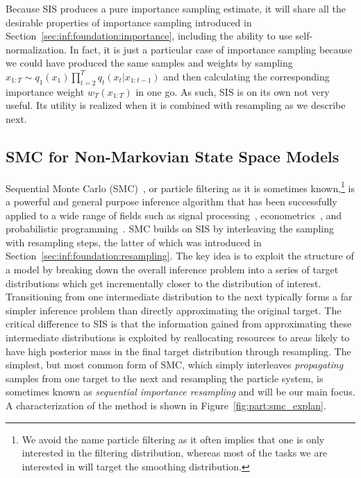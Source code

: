 Because SIS produces a pure importance sampling estimate, it will share all the desirable properties
of importance sampling introduced in Section~\ref{sec:inf:foundation:importance}, including the
ability to use self-normalization.  In fact, it is just
a particular case of importance sampling because we could have produced the same samples and weights
by sampling $x_{1:T} \sim q_1(x_1) \prod_{t=2}^{T} q_t (x_t | x_{1:t-1})$ and then calculating the
corresponding importance weight $w_T(x_{1:T})$ in one go. As such, 
SIS is on its own not very useful.  Its utility is realized when it is combined with resampling as we describe next.

\subsection{SMC for Non-Markovian State Space Models}
\label{sec:part:smc:smc-nmssm}

Sequential Monte Carlo (SMC)~\citep{gordon1993novel,doucet2001sequential,doucet2009tutorial}, or particle filtering 
as it is sometimes known,\footnote{We avoid the name
	particle filtering as it often implies that one is only interested in the filtering distribution, whereas
	most of the tasks we are interested in will target the smoothing distribution.} 
is a powerful and general purpose inference algorithm that has been successfully
applied to a wide range of fields such as signal processing~\citep{candy2016bayesian}, econometrics~\citep{creal2012survey}, 
and probabilistic programming~\citep{wood2014new}.  SMC builds on SIS by interleaving the sampling
with resampling steps, the latter
of which was introduced in Section~\ref{sec:inf:foundation:resampling}.
The key idea is to exploit the structure of a model by breaking down the overall 
inference problem into a series of target distributions which get incrementally closer to the 
distribution of interest.  Transitioning from one intermediate distribution to the next typically
forms a far simpler inference problem than directly approximating the original target.  The critical difference
to SIS is that
the information gained from approximating these intermediate distributions is exploited by
reallocating resources to areas likely to have high posterior mass in the final target distribution
through resampling.  The simplest, but most common form of SMC, which simply interleaves
\emph{propagating} samples from one target to the next and resampling the particle system, is sometimes known
as \emph{sequential importance resampling} and will be our main focus.
A characterization of the method is shown in Figure~\ref{fig:part:smc_explan}.  

